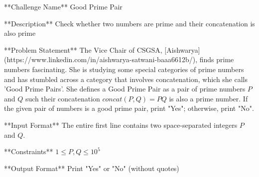 **Challenge Name**  
Good Prime Pair

**Description**  
Check whether two numbers are prime and their concatenation is also prime

**Problem Statement**  
The Vice Chair of CSGSA, [Aishwarya](https://www.linkedin.com/in/aishwarya-satwani-baaa6612b/), finds prime numbers fascinating. She is studying some special categories of prime numbers and has stumbled across a category that involves concatenation, which she calls 'Good Prime Pairs'. She defines a Good Prime Pair as a pair of prime numbers $P$ and $Q$ such their concatenation $concat(P,Q) = PQ$ is also a prime number. If the given pair of numbers is a good prime pair, print "Yes"; otherwise, print "No".

**Input Format**  
The entire first line contains two space-separated integers $P$ and $Q$.  

**Constraints**  
$1 \leq P, Q \leq 10^5$ 

**Output Format**  
Print "Yes" or "No" (without quotes)
